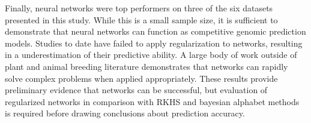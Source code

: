 Finally, neural networks were top performers on three of the six datasets
presented in this study. While this is a small sample size, it is
sufficient to demonstrate that neural networks can function as 
competitive genomic prediction models. Studies to date have failed 
to apply regularization to networks, resulting in a underestimation 
of their predictive ability. A large body of work outside of plant 
and animal breeding literature demonstrates that networks can 
rapidly solve complex problems when applied appropriately.
These results provide preliminary evidence that networks can be successful,
but evaluation of regularized networks in comparison with RKHS and 
bayesian alphabet methods is required before drawing conclusions about 
prediction accuracy.




